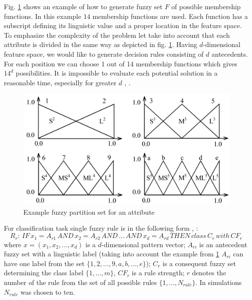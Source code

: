 Fig. \ref{fig:fuzzy_example} shows an example of how to generate fuzzy set $F$ of
possible membership functions. In this example $14$ membership functions are used. 
Each function has a subscript defining its linguistic value and a proper
location in the feature space. To emphasize the complexity of the problem let take 
into account that each attribute is divided in the same way as depicted in fig. \ref{fig:fuzzy_example}. 
Having $d$-dimensional feature space, we would like to generate decision rules consisting of $d$ antecedents.
For each position we can choose 1 out of 14 membership functions which gives $14^d$ possibilities. 
It is impossible to evaluate each potential solution in a reasonable time, especially for greater $d$ \cite{bib27}, \cite{bib33}. 
\begin{figure}[H]
    \begin{center}
        \includegraphics[width=\textwidth]{fig/fuzzy_example.png}
    \end{center}
    \caption{Example fuzzy partition set for an attribute}
    \label{fig:fuzzy_example}
\end{figure}
For classification task single fuzzy rule is in the following form
\cite{bib30}, \cite{bib20}:
$$R_r:\, IF\, x_1=A_{r1}\, AND\, x_2=A_{r2}\, AND\, \ldots\, AND\, x_d=A_{rd}\, THEN\,
class\, C_r\, with \, CF_r$$
where $x=(x_1, x_2, \ldots, x_d)$ is a $d$-dimensional pattern vector; $A_{ri}$
is an antecedent fuzzy set with a linguistic label (taking into account the
example from \ref{fig:fuzzy_example} $A_{ri}$ can have one label from the set
$\{1, 2, \ldots, 9, a, b, \ldots, e \}$); $C_r$ is a consequent fuzzy set
determining the class label $\{1, \ldots, m\}$, $CF_r$ is a rule strength; $r$
denotes the number of the rule from the set of all possible rules $\{1, \ldots, N_{rule}\}$. 
In simulations $N_{rule}$ was chosen to ten. 
